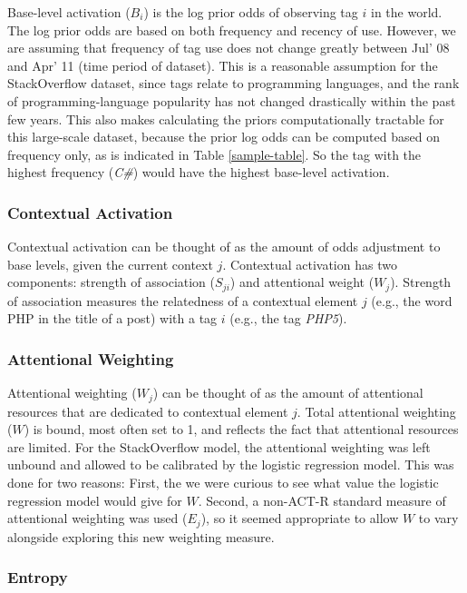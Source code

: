 \documentclass[10pt,letterpaper]{article}
\begin{document}
Base-level activation ($B_{i}$) is the log prior odds of observing tag $i$ in the world.
The log prior odds are based on both frequency and recency of use.
However, we are assuming that frequency of tag use does not change greatly between Jul' 08 and Apr' 11 (time period of dataset).
This is a reasonable assumption for the StackOverflow dataset, since tags relate to programming languages, and the rank of programming-language popularity has not changed drastically within the past few years.
This also makes calculating the priors computationally tractable for this large-scale dataset, because the prior log odds can be computed based on frequency only, as is indicated in Table \ref{sample-table}.
So the tag with the highest frequency (\emph{C\#}) would have the highest base-level activation.

\subsubsection{Contextual Activation}

Contextual activation can be thought of as the amount of odds adjustment to base levels, given the current context $j$.
Contextual activation has two components: strength of association ($S_{ji}$) and attentional weight ($W_{j}$).
Strength of association measures the relatedness of a contextual element $j$ (e.g., the word PHP in the title of a post) with a tag $i$ (e.g., the tag \emph{PHP5}).

\subsubsection{Attentional Weighting}

Attentional weighting ($W_{j}$) can be thought of as the amount of attentional resources that are dedicated to contextual element $j$.
Total attentional weighting ($W$) is bound, most often set to 1, and reflects the fact that attentional resources are limited.
For the StackOverflow model, the attentional weighting was left unbound and allowed to be calibrated by the logistic regression model.
This was done for two reasons:
First, the we were curious to see what value the logistic regression model would give for $W$.
Second, a non-ACT-R standard measure of attentional weighting was used ($E_{j}$), so it seemed appropriate to allow $W$ to vary alongside exploring this new weighting measure.

\subsubsection{Entropy}
\end{document}

